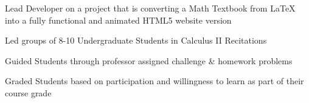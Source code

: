 \documentclass[letterpaper]{deedy-resume} %
\begin{document}
\begin{minipage}[t]{0.66\textwidth}
\begin{tightitemize}
\item Lead Developer on a project that is converting a Math Textbook from \LaTeX \hspace*{0.3mm} into a fully functional and animated HTML5 website version
\end{tightitemize}

\sectionspace %



\begin{tightitemize}
\item Led groups of 8-10 Undergraduate Students in Calculus II Recitations 
\item Guided Students through professor assigned challenge \& homework problems
\item Graded Students based on participation and willingness to learn as part of their course grade
\end{tightitemize}

\sectionspace %







\end{minipage}
\end{document}

